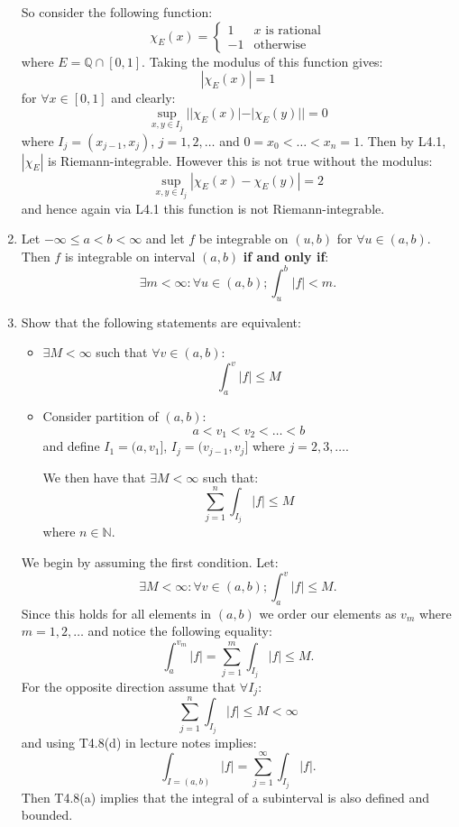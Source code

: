 \begin{enumerate}
    So consider the following function:
    $$\chi_E(x)=
    \left\{
    \begin{array}{ll}
	1  & \mbox{$x$ is rational}\\
	-1 & \mbox{otherwise}
    \end{array}
    \right.$$
    where $E=\mathbb{Q}\cap[0,1]$. Taking the modulus
    of this function gives:
    $$|\chi_E(x)|=1$$
    for $\forall x\in[0,1]$ and clearly:
    $$\sup_{x,y\in I_j}||\chi_E(x)|-|\chi_E(y)||=0$$
    where $I_j=(x_{j-1},x_j)$, $j=1,2,\dots$ and
    $0=x_0<\dots<x_n=1$. Then by L4.1,
    $|\chi_E|$ is Riemann-integrable.
    However this is not true without the modulus:
    $$\sup_{x,y\in I_j}|\chi_E(x)-\chi_E(y)|=2$$
    and hence again via L4.1 this function is not
    Riemann-integrable. \\

    \item Let $-\infty\leq a<b<\infty$ and let
    $f$ be integrable on $(u,b)$ for $\forall u\in(a,b)$. \\
    Then $f$ is integrable on interval $(a,b)$ \textbf{if and only if}:
    $$\exists m<\infty:\forall u\in(a,b);\int_{u}^{b}|f|<m.$$

    \newpage

    \item Show that the following statements are equivalent:
    \begin{itemize}
        \item $\exists M<\infty$ such that $\forall v\in(a,b)$:
        $$\int_{a}^{v}|f|\leq M$$

        \item Consider partition of $(a,b)$:
        $$a<v_1<v_2<\dots<b$$
        and define $I_1=(a,v_1]$, $I_j=(v_{j-1},v_j]$
        where $j=2,3,\dots$.

        We then have that $\exists M<\infty$ such that:
        $$\sum_{j=1}^{n}\int_{I_j}|f|\leq M$$
        where $n\in\mathbb{N}$. \\
    \end{itemize}

    We begin by assuming the first condition. Let:
    $$\exists M<\infty:\forall v\in(a,b);
    \int_{a}^{v}|f|\leq M.$$
    Since this holds for all elements in $(a,b)$ we
    order our elements as $v_m$ where $m=1,2,\dots$
    and notice the following equality:
    $$\int_{a}^{v_m}|f|=\sum_{j=1}^{m}\int_{I_j}|f|\leq M.$$
    For the opposite direction assume that $\forall I_j$:
    $$\sum_{j=1}^{n}
    \int_{I_j}|f|\leq M<\infty$$
    and using T4.8(d) in lecture notes implies:
    $$\int_{I=(a,b)}|f|=\sum_{j=1}^{\infty}\int_{I_j}|f|.$$
    Then T4.8(a) implies that the integral of a subinterval
    is also defined and bounded.


\end{enumerate}
